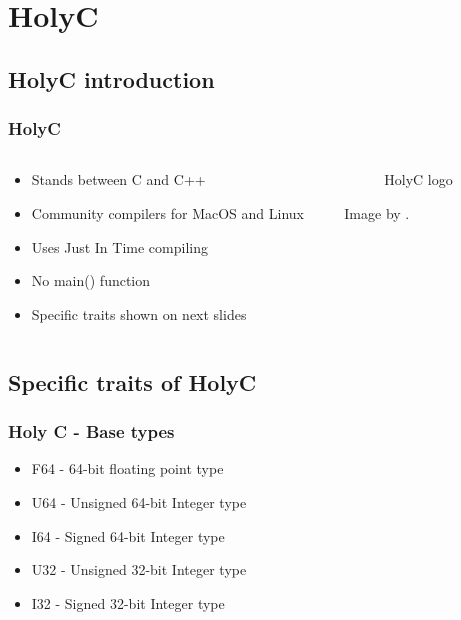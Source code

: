 \documentclass{beamer}
\begin{document}
	\section{HolyC}
	\subsection{HolyC introduction}
	\begin{frame}
		\frametitle{HolyC}
		\begin{columns}
			\begin{column}{0.6\textwidth}
				\begin{itemize}
					\item Stands between C and C++

					\item Community compilers for MacOS and Linux

					\item Uses Just In Time compiling

					\item No main() function

					\item Specific traits shown on next slides
				\end{itemize}
			\end{column}
			\begin{column}{0.4\textwidth}
				\begin{figure}
					\centering
					
					\caption{HolyC logo}
					\label{fig:HolyC_logo}
				\end{figure}
				Image by \cite{1ctinus_english_2020}.
			\end{column}
		\end{columns}
	\end{frame}

	\subsection{Specific traits of HolyC}
	\begin{frame}
		\frametitle{Holy C - Base types}
		\begin{itemize}
			\item F64 - 64-bit floating point type

			\item U64 - Unsigned 64-bit Integer type

			\item I64 - Signed 64-bit Integer type

			\item U32 - Unsigned 32-bit Integer type

			\item I32 - Signed 32-bit Integer type
		\end{itemize}
	\end{frame}
\end{document}

